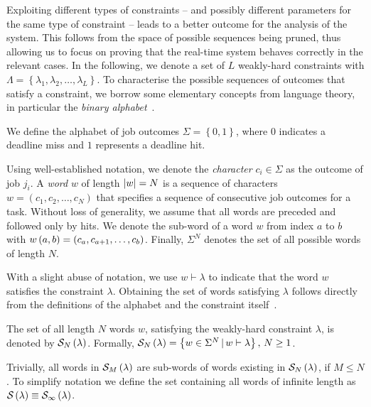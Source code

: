 Exploiting different types of constraints -- and possibly different parameters for the same type of constraint -- leads to a better outcome for the analysis of the system. 
This follows from the space of possible sequences being pruned, thus allowing us to focus on proving that the real-time system behaves correctly in the relevant cases. 
In the following, we denote a set of $L$ weakly-hard constraints with $\Lambda = \left\{ \lambda_1, \lambda_2, \ldots, \lambda_L \right\} $. 
To characterise the possible sequences of outcomes that satisfy a constraint, we borrow some elementary concepts from language theory, in particular the \emph{binary alphabet}~\cite{Hopcroft:2006}.
%
\begin{definition}%
\label{def:alphabet}%
    We define the alphabet of job outcomes $\Sigma = \left\{ 0, 1 \right\}$, where $0$ indicates a deadline miss and $1$ represents a deadline hit.
\end{definition}
%
Using well-established notation, we denote the \emph{character} $c_i \in \Sigma$ as the outcome of job $j_i$.
A \emph{word} $w$ of length $\left|w\right| = N$ is a sequence of characters $w = \left( c_1, c_2, \ldots, c_N \right)$ that specifies a sequence of consecutive job outcomes for a task.
Without loss of generality, we assume that all words are preceded and followed only by hits.
We denote the sub-word of a word $w$ from index $a$ to $b$ with $w\left( a, b \right) = \left( c_a, c_{a+1}, \ldots, c_b \right)$.
Finally, $\Sigma^N$ denotes the set of all possible words of length $N$.

With a slight abuse of notation, we use $w \vdash \lambda$ to indicate that the word $w$ satisfies the constraint $\lambda$.
Obtaining the set of words satisfying $\lambda$ follows directly from the definitions of the alphabet and the constraint itself~\cite{Bernat:2001, Bernat:1998}.
%
\begin{definition}%
    \label{def:satisfaction-set}%
    The set of all length $N$ words $w$, satisfying the weakly-hard constraint $\lambda$, is denoted by $\mathcal{S}_{N}\left( \lambda \right)$.
    Formally, $\mathcal{S}_{N}\left( \lambda \right) = \left\{ w \in \Sigma^N \, | \, w \vdash \lambda \right\},\, N \geq 1$.
\end{definition}
%
Trivially, all words in $\mathcal{S}_{M}\left( \lambda \right)$ are sub-words of words existing in $\mathcal{S}_{N}\left( \lambda \right)$, if $M \leq N$.
To simplify notation we define the set containing all words of infinite length as $\mathcal{S}_{}\left( \lambda \right) \equiv \mathcal{S}_{\infty}\left( \lambda \right)$.

